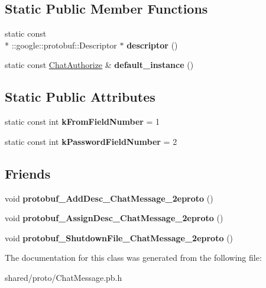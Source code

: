 \subsection*{Static Public Member Functions}
\begin{DoxyCompactItemize}
\item 
\hypertarget{classSimpleChat_1_1ChatAuthorize_a73777df8cfd92e3ea82f27d7fdb2b0e9}{static const \\*
\-::google\-::protobuf\-::\-Descriptor $\ast$ {\bfseries descriptor} ()}\label{classSimpleChat_1_1ChatAuthorize_a73777df8cfd92e3ea82f27d7fdb2b0e9}

\item 
\hypertarget{classSimpleChat_1_1ChatAuthorize_adb0513feb6b35f1ded55c3af00a6d2d8}{static const \hyperlink{classSimpleChat_1_1ChatAuthorize}{Chat\-Authorize} \& {\bfseries default\-\_\-instance} ()}\label{classSimpleChat_1_1ChatAuthorize_adb0513feb6b35f1ded55c3af00a6d2d8}

\end{DoxyCompactItemize}
\subsection*{Static Public Attributes}
\begin{DoxyCompactItemize}
\item 
\hypertarget{classSimpleChat_1_1ChatAuthorize_ac40beded29445d79e301f53f81e2c153}{static const int {\bfseries k\-From\-Field\-Number} = 1}\label{classSimpleChat_1_1ChatAuthorize_ac40beded29445d79e301f53f81e2c153}

\item 
\hypertarget{classSimpleChat_1_1ChatAuthorize_ad1fdee1f90e42f300135651f9440fbf4}{static const int {\bfseries k\-Password\-Field\-Number} = 2}\label{classSimpleChat_1_1ChatAuthorize_ad1fdee1f90e42f300135651f9440fbf4}

\end{DoxyCompactItemize}
\subsection*{Friends}
\begin{DoxyCompactItemize}
\item 
\hypertarget{classSimpleChat_1_1ChatAuthorize_ab0d9593aa41361f04ab91f917ef9ec0e}{void {\bfseries protobuf\-\_\-\-Add\-Desc\-\_\-\-Chat\-Message\-\_\-2eproto} ()}\label{classSimpleChat_1_1ChatAuthorize_ab0d9593aa41361f04ab91f917ef9ec0e}

\item 
\hypertarget{classSimpleChat_1_1ChatAuthorize_a4ca7b2c64786782406ca69f6ba39ccb2}{void {\bfseries protobuf\-\_\-\-Assign\-Desc\-\_\-\-Chat\-Message\-\_\-2eproto} ()}\label{classSimpleChat_1_1ChatAuthorize_a4ca7b2c64786782406ca69f6ba39ccb2}

\item 
\hypertarget{classSimpleChat_1_1ChatAuthorize_a78726b79d52a130a50d7670a5c0238fc}{void {\bfseries protobuf\-\_\-\-Shutdown\-File\-\_\-\-Chat\-Message\-\_\-2eproto} ()}\label{classSimpleChat_1_1ChatAuthorize_a78726b79d52a130a50d7670a5c0238fc}

\end{DoxyCompactItemize}


The documentation for this class was generated from the following file\-:\begin{DoxyCompactItemize}
\item 
shared/proto/Chat\-Message.\-pb.\-h\end{DoxyCompactItemize}

